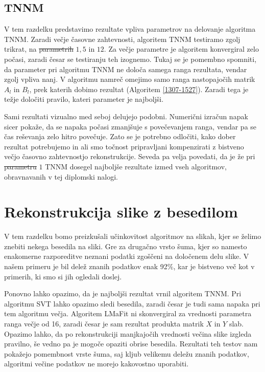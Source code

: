 \subsection{TNNM}
V tem razdelku predstavimo rezultate vpliva parametrov na delovanje algoritma TNNM. Zaradi večje časovne zahtevnosti, algoritem TNNM testiramo zgolj trikrat, na \st{parametrih} $1, 5$ in $12$. Za večje parametre je algoritem konvergiral zelo počasi, zaradi česar se testiranju teh izognemo. Tukaj se je pomembno spomniti, da parameter pri algoritmu TNNM ne določa samega ranga rezultata, vendar zgolj vpliva nanj.
V algoritmu namreč omejimo samo ranga nastopajočih matrik $A_l$ in $B_l$, prek katerih dobimo rezultat (Algoritem \ref{1307-1527}). Zaradi tega je težje določiti pravilo, kateri parameter je najboljši.

\FloatBarrier


Sami rezultati vizualno med seboj delujejo podobni. Numerični izračun napak sicer pokaže, da se napaka počasi zmanjšuje s povečevanjem ranga, vendar pa se čas reševanja zelo hitro povečuje. Zato se je potrebno odločiti, kako dober rezultat potrebujemo in ali smo točnost pripravljani kompenzirati z bistveno večjo časovno zahtevnostjo rekonstrukcije. Seveda pa velja povedati, da je že pri \st{parametru}  $1$ TNNM dosegel najboljše rezultate izmed vseh algoritmov, obravnavanih v tej diplomski nalogi.

\section{Rekonstrukcija slike z besedilom} \label{1307-2254}
V tem razdelku bomo preizkušali učinkovitost algoritmov na slikah, kjer se želimo znebiti nekega besedila na sliki. Gre za drugačno vrsto šuma, kjer so namesto enakomerne razporeditve neznani podatki zgoščeni na določenem delu slike. V našem primeru je bil delež znanih podatkov enak 92\%, kar je bistveno več kot v primerih, ki smo si jih ogledali doslej.


Ponovno lahko opazimo, da je najboljši rezultat vrnil algoritem TNNM. Pri algoritmu SVT lahko opazimo sledi besedila, zaradi česar je tudi sama napaka pri tem algoritmu večja. Algoritem LMaFit ni skonvergiral za vrednosti parametra ranga večje od 16, zaradi česar je sam rezultat produkta matrik $X$ in $Y$ slab. Opazimo lahko, da po rekonstrukciji  manjkajočih vrednosti večina slike izgleda pravilno, še vedno pa je mogoče opaziti obrise besedila.
Rezultati teh testov nam pokažejo pomembnost vrste šuma, saj kljub velikemu deležu znanih podatkov, algoritmi večine podatkov ne morejo kakovostno uporabiti.

